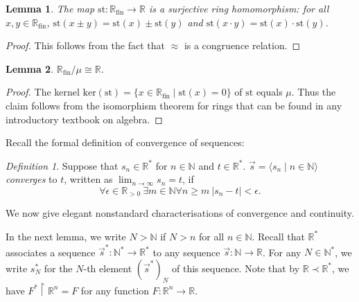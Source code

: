 \documentclass[a4paper, 11pt]{amsart}
\newtheorem{lemma}[lemma]{Lemma}
\theoremstyle{remark}
\newtheorem{definition}[definition]{Definition}
\newcommand{\NN}{\mathbb{N}}
\newcommand{\st}{\mathrm{st}}
\DeclareMathOperator{\fin}{fin}
\newcommand{\RR}{\mathbb{R}}
\begin{document}
\begin{lemma} 
The map $\st\colon \RR_{\fin} \rightarrow \RR$ is a surjective ring homomorphism: 
for all $x,y\in \RR_{\fin}$, 
$\st(x \pm y ) = \st(x) \pm \st(y)$ and $\st(x \cdot y ) = \st(x) \cdot \st(y)$. 
\end{lemma} 
\begin{proof} 
This follows from the fact that $\approx$ is a congruence relation. 
\end{proof} 

\begin{lemma} 
$\RR_{\fin}/\mu \cong \RR$. 
\end{lemma} 
\begin{proof} 
The kernel $\mathrm{ker}(\st)=\{ x \in \RR_{\fin} \mid \st(x)=0 \}$ of $\st$ equals $\mu$. 
Thus the claim follows from the isomorphism theorem for rings that can be found in any introductory textbook on algebra. 
\end{proof} 

Recall the formal definition of convergence of sequences: 

\begin{definition} 
Suppose that $s_n \in \RR^*$ for $n\in\NN$ and $t\in \RR^*$. 
$\vec{s} = \langle s_n \mid n\in \NN\rangle$ \emph{converges} to $t$, written as $\lim_{n\rightarrow \infty} s_n = t$, if 
$$ \forall \epsilon \in \RR_{>0}\ \exists m\in \NN \forall n\geq m\ |s_n-t| < \epsilon.$$ 
\end{definition} 


We now give elegant nonstandard characterisations of convergence and continuity. 

In the next lemma, we write $N>\NN$ if $N>n$ for all $n\in\NN$. 
Recall that $\RR^*$ associates a sequence $\vec{s}^*\colon \NN^*\rightarrow \RR^*$ to any sequence $\vec{s}\colon \NN\rightarrow \RR$. 
For any $N\in \NN^*$, we write $s^*_N$ for the $N$-th element $(\vec{s}^*)_N$ of this sequence. 
Note that by $\RR\prec \RR^*$, we have $F^*{\upharpoonright} \RR^n=F$ for any function $F\colon \RR^n \rightarrow \RR$. 
\end{document}
